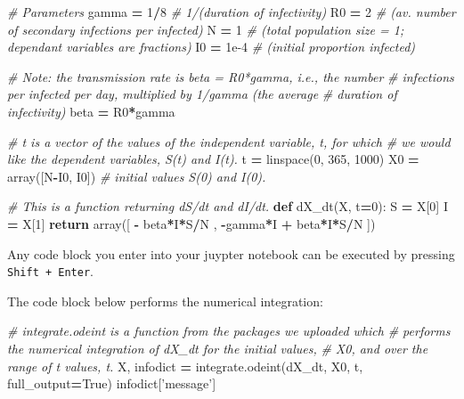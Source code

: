 \documentclass[]{book}
\newenvironment{Shaded}{\begin{snugshade}}{\end{snugshade}}
\newcommand{\KeywordTok}[1]{\textcolor[rgb]{0.13,0.29,0.53}{\textbf{{#1}}}}
\newcommand{\DecValTok}[1]{\textcolor[rgb]{0.00,0.00,0.81}{{#1}}}
\newcommand{\FloatTok}[1]{\textcolor[rgb]{0.00,0.00,0.81}{{#1}}}
\newcommand{\StringTok}[1]{\textcolor[rgb]{0.31,0.60,0.02}{{#1}}}
\newcommand{\CommentTok}[1]{\textcolor[rgb]{0.56,0.35,0.01}{\textit{{#1}}}}
\newcommand{\VariableTok}[1]{\textcolor[rgb]{0.00,0.00,0.00}{{#1}}}
\newcommand{\ControlFlowTok}[1]{\textcolor[rgb]{0.13,0.29,0.53}{\textbf{{#1}}}}
\newcommand{\OperatorTok}[1]{\textcolor[rgb]{0.81,0.36,0.00}{\textbf{{#1}}}}
\newcommand{\NormalTok}[1]{{#1}}
\begin{document}
\begin{Shaded}
\begin{Highlighting}[]
\CommentTok{# Parameters}
\NormalTok{gamma }\OperatorTok{=} \DecValTok{1}\OperatorTok{/}\DecValTok{8} \CommentTok{# 1/(duration of infectivity)}
\NormalTok{R0 }\OperatorTok{=} \DecValTok{2} \CommentTok{# (av. number of secondary infections per infected)}
\NormalTok{N }\OperatorTok{=} \DecValTok{1} \CommentTok{# (total population size = 1; dependant variables are fractions)}
\NormalTok{I0 }\OperatorTok{=} \FloatTok{1e-4} \CommentTok{# (initial proportion infected)}

\CommentTok{# Note: the transmission rate is beta = R0*gamma, i.e., the number}
\CommentTok{# infections per infected per day, multiplied by 1/gamma (the average}
\CommentTok{# duration of infectivity)}
\NormalTok{beta }\OperatorTok{=} \NormalTok{R0}\OperatorTok{*}\NormalTok{gamma}

\CommentTok{# t is a vector of the values of the independent variable, t, for which}
\CommentTok{# we would like the dependent variables, S(t) and I(t).}
\NormalTok{t }\OperatorTok{=} \NormalTok{linspace(}\DecValTok{0}\NormalTok{, }\DecValTok{365}\NormalTok{, }\DecValTok{1000}\NormalTok{) }
\NormalTok{X0 }\OperatorTok{=} \NormalTok{array([N}\OperatorTok{-}\NormalTok{I0, I0]) }\CommentTok{# initial values S(0) and I(0).}

\CommentTok{# This is a function returning dS/dt and dI/dt.}
\KeywordTok{def} \NormalTok{dX_dt(X, t}\OperatorTok{=}\DecValTok{0}\NormalTok{):}
    \NormalTok{S }\OperatorTok{=} \NormalTok{X[}\DecValTok{0}\NormalTok{]}
    \NormalTok{I }\OperatorTok{=} \NormalTok{X[}\DecValTok{1}\NormalTok{]}
    \ControlFlowTok{return} \NormalTok{array([ }\OperatorTok{-} \NormalTok{beta}\OperatorTok{*}\NormalTok{I}\OperatorTok{*}\NormalTok{S}\OperatorTok{/}\NormalTok{N ,}
                  \OperatorTok{-}\NormalTok{gamma}\OperatorTok{*}\NormalTok{I }\OperatorTok{+} \NormalTok{beta}\OperatorTok{*}\NormalTok{I}\OperatorTok{*}\NormalTok{S}\OperatorTok{/}\NormalTok{N ])}
\end{Highlighting}
\end{Shaded}

Any code block you enter into your juypter notebook can be executed by
pressing \texttt{Shift\ +\ Enter}.

The code block below performs the numerical integration:

\begin{Shaded}
\begin{Highlighting}[]
\CommentTok{# integrate.odeint is a function from the packages we uploaded which}
\CommentTok{# performs the numerical integration of dX_dt for the initial values,}
\CommentTok{# X0, and over the range of t values, t.}
\NormalTok{X, infodict }\OperatorTok{=} \NormalTok{integrate.odeint(dX_dt, X0, t, full_output}\OperatorTok{=}\VariableTok{True}\NormalTok{)}
\NormalTok{infodict[}\StringTok{'message'}\NormalTok{] }
\end{Highlighting}
\end{Shaded}
\end{document}
